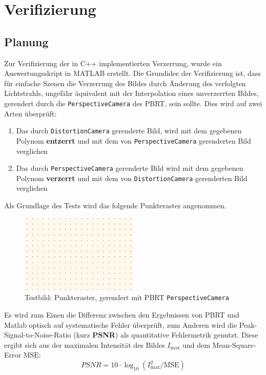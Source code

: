 \section{Verifizierung}
\subsection{Planung}
Zur Verifizierung der in C++ implementierten Verzerrung, wurde ein Auswertungsskript in MATLAB erstellt. Die Grundidee der Verifizierung ist, dass für einfache Szenen die Verzerrung des Bildes durch Änderung des verfolgten Lichtstrahls, ungefähr äquivalent mit der Interpolation eines unverzerrten Bildes, gerendert durch die \texttt{PerspectiveCamera} des PBRT, sein sollte.
Dies wird auf zwei Arten überprüft:
\begin{enumerate}
	\item Das durch \texttt{DistortionCamera} gerenderte Bild, wird mit dem gegebenen Polynom \textbf{entzerrt} und mit dem von \texttt{PerspectiveCamera} gerenderten Bild verglichen
	\item Das durch \texttt{PerspectiveCamera} gerenderte Bild wird mit dem gegebenen Polynom \textbf{verzerrt} und mit dem von \texttt{DistortionCamera} gerenderten Bild verglichen
\end{enumerate}

Als Grundlage des Tests wird das folgende Punkteraster angenommen. 

\begin{figure}
	\centering
	\includegraphics[width=0.5\textwidth]{img/dot_perspective.png}
	\caption{Testbild: Punkteraster, gerendert mit PBRT \texttt{PerspectiveCamera}}
	\label{fig:test_img}
\end{figure}

Es wird zum Einen die Differenz zwischen den Ergebnissen von PBRT und Matlab optisch auf systematische Fehler überprüft, zum Anderen wird die Peak-Signal-to-Noise-Ratio (kurz \textbf{PSNR}) als quantitative Fehlermetrik genutzt.
Diese ergibt sich aus der maximalen Intensität des Bildes $I_\text{max}$ und dem Mean-Square-Error $\text{MSE}$:
\begin{equation}
	PSNR = 10\cdot \log_10 (I_\text{max}^2/\text{MSE})
\end{equation}

